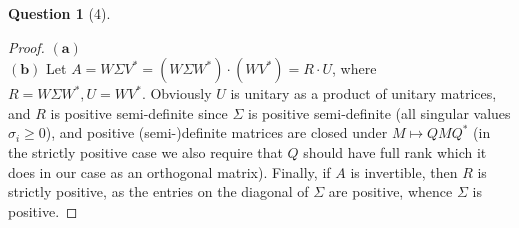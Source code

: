 \documentclass[11pt]{article}
\theoremstyle{quest}
\newtheorem*{question}{Question}
\begin{document}
\begin{question}[4]
\end{question}
\begin{proof}
$\mathbf{(a)}$ 
\\$\mathbf{(b)}$ Let $A = W\Sigma V^* = (W \Sigma W^*) \cdot (WV^*) = R \cdot U$, where $R = W \Sigma W^*, U = WV^*$. Obviously $U$ is unitary as a product of unitary matrices, and $R$ is positive semi-definite since $\Sigma$ is positive semi-definite (all singular values $\sigma_i \ge 0$), and positive (semi-)definite matrices are closed under $M \mapsto QMQ^*$ (in the strictly positive case we also require that $Q$ should have full rank which it does in our case as an orthogonal matrix). Finally, if $A$ is invertible, then $R$ is strictly positive, as the entries on the diagonal of $\Sigma$ are positive, whence $\Sigma$ is positive.
\end{proof}
\end{document}
